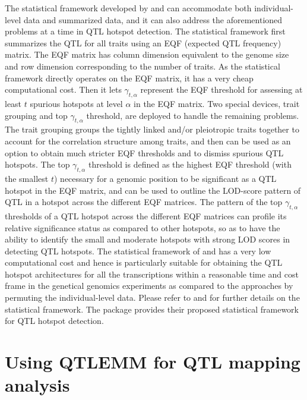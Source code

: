 The statistical framework developed by \citet{Yang-2019} and \citet{Wu-2021} can accommodate both individual-level data and summarized data, and it can also address the aforementioned problems at a time in QTL hotspot detection. The statistical framework first summarizes the QTL for all traits using an EQF (expected QTL frequency) matrix. The EQF matrix has column dimension equivalent to the genome size and row dimension corresponding to the number of traits. As the statistical framework directly operates on the EQF matrix, it has a very cheap computational cost. Then it lets $\gamma_{t,\alpha}$ represent the EQF threshold for assessing at least $t$ spurious hotspots at level $\alpha$ in the EQF matrix. Two special devices, trait grouping and top $\gamma_{t,\alpha}$ threshold, are deployed to handle the remaining problems. The trait grouping groups the tightly linked and/or pleiotropic traits together to account for the correlation structure among traits, and then can be used as an option to obtain much stricter EQF thresholds and to dismiss spurious QTL hotspots. The top $\gamma_{t,\alpha}$ threshold is defined as the highest EQF threshold (with the smallest $t$) necessary for a genomic position to be significant as a QTL hotspot in the EQF matrix, and can be used to outline the LOD-score pattern of QTL in a hotspot across the different EQF matrices. The pattern of the top $\gamma_{t,\alpha}$ thresholds of a QTL hotspot across the different EQF matrices can profile its relative significance status as compared to other hotspots, so as to have the ability to identify the small and moderate hotspots with strong LOD scores in detecting QTL hotspots. The statistical framework of \citeauthor{Yang-2019} and \citeauthor{Wu-2021} has a very low computational cost and hence is particularly suitable for obtaining the QTL hotspot architectures for all the transcriptions within a reasonable time and cost frame in the genetical genomics experiments as compared to the approaches by permuting the individual-level data. Please refer to \citet{Yang-2019} and \citet{Wu-2021} for further details on the statistical framework. The  package provides their proposed statistical framework for QTL hotspot detection.

\section{Using QTLEMM for QTL mapping analysis}

